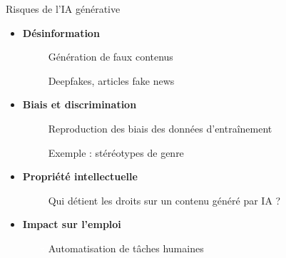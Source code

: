 \begin{frame}{Risques de l'IA générative}

\begin{itemize}
    \item<+->[\colorwarning{red}] \textbf{Désinformation}
        \begin{itemize}
            \item[\textcolor{white}{x}] Génération de faux contenus
            \item[\textcolor{white}{x}] Deepfakes, articles fake news
        \end{itemize}

    \vspace{0.2cm}
    \item<+->[\colorwarning{red}] \textbf{Biais et discrimination}
        \begin{itemize}
            \item[\textcolor{white}{x}] Reproduction des biais des données d'entraînement
            \item[\textcolor{white}{x}] Exemple : stéréotypes de genre
        \end{itemize}

    \vspace{0.2cm}
    \item<+->[\colorwarning{red}] \textbf{Propriété intellectuelle}
        \begin{itemize}
            \item[\textcolor{white}{x}] Qui détient les droits sur un contenu généré par IA ?
        \end{itemize}

    \vspace{0.2cm}
    \item<+->[\colorwarning{red}] \textbf{Impact sur l'emploi}
        \begin{itemize}
            \item[\textcolor{white}{x}] Automatisation de tâches humaines
        \end{itemize}
\end{itemize}

\end{frame}


